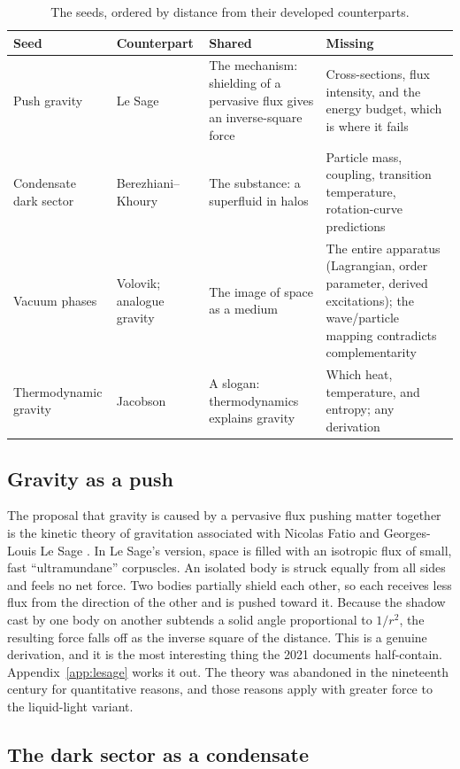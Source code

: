 \documentclass[11pt]{article}
\begin{document}
\begin{table}[h]
\centering\small
\begin{tabular}{@{}p{2.6cm}p{2.9cm}p{3.6cm}p{3.6cm}@{}}
\toprule
Seed & Counterpart & Shared & Missing \\
\midrule
Push gravity & Le Sage & The mechanism: shielding of a pervasive flux gives an inverse-square force & Cross-sections, flux intensity, and the energy budget, which is where it fails \\
Condensate dark sector & Berezhiani--Khoury & The substance: a superfluid in halos & Particle mass, coupling, transition temperature, rotation-curve predictions \\
Vacuum phases & Volovik; analogue gravity & The image of space as a medium & The entire apparatus (Lagrangian, order parameter, derived excitations); the wave/particle mapping contradicts complementarity \\
Thermodynamic gravity & Jacobson & A slogan: thermodynamics explains gravity & Which heat, temperature, and entropy; any derivation \\
\bottomrule
\end{tabular}
\caption{The seeds, ordered by distance from their developed counterparts.}
\label{tab:seeds}
\end{table}

\subsection{Gravity as a push}

The proposal that gravity is caused by a pervasive flux pushing matter together is the kinetic theory of gravitation associated with Nicolas Fatio and Georges-Louis Le Sage \cite{lesage1784}. In Le Sage's version, space is filled with an isotropic flux of small, fast ``ultramundane'' corpuscles. An isolated body is struck equally from all sides and feels no net force. Two bodies partially shield each other, so each receives less flux from the direction of the other and is pushed toward it. Because the shadow cast by one body on another subtends a solid angle proportional to $1/r^2$, the resulting force falls off as the inverse square of the distance. This is a genuine derivation, and it is the most interesting thing the 2021 documents half-contain. Appendix~\ref{app:lesage} works it out. The theory was abandoned in the nineteenth century for quantitative reasons, and those reasons apply with greater force to the liquid-light variant.

\subsection{The dark sector as a condensate}
\end{document}
